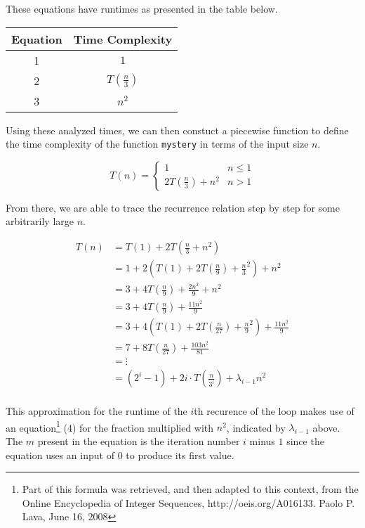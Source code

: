 \documentclass[12pt]{article}
\begin{document}
These equations have runtimes as presented in the table below.

\begin{center}
\begin{tabular}{c|c}
Equation & Time Complexity \\
\hline
1 & $1$ \\
2 & $T(\frac{n}{3})$ \\
3 & $n^2$
\end{tabular}
\end{center}

Using these analyzed times, we can then constuct a piecewise function to define the time complexity of the function \texttt{mystery} in terms of the input size $n$.

\[ T(n) = \begin{cases}
    1 & n \leq 1 \\
    2 T(\frac{n}{3}) + n^2 & n > 1
\end{cases} \]

From there, we are able to trace the recurrence relation step by step for some arbitrarily large $n$.

\begin{align*}
    T(n) &= T(1) + 2 T(\frac{n}{3} + n^2) \\
    &= 1 + 2 (T(1) + 2T(\frac{n}{9}) + \frac{n}{3}^2) + n^2 \\
    &= 3 + 4T(\frac{n}{9}) + \frac{2n^2}{9} + n^2 \\
    &= 3 + 4T(\frac{n}{9}) + \frac{11n^2}{9} \\
    &= 3 + 4 (T(1) + 2T(\frac{n}{27}) + \frac{n}{9}^2) + \frac{11n^2}{9} \\
    &= 7 + 8T(\frac{n}{27}) + \frac{103n^2}{81} \\
    &= \vdots \\
    &= (2^i - 1) + 2i \cdot T(\frac{n}{3^i}) + \lambda_{i-1}n^2
\end{align*} \\

This approximation for the runtime of the $i$th recurence of the loop makes use of an equation\footnote{Part of this formula was retrieved, and then adapted to this context, from the Online Encyclopedia of Integer Sequences, http://oeis.org/A016133. Paolo P. Lava, June 16, 2008} (4) for the fraction multiplied with $n^2$, indicated by $\lambda_{i-1}$ above. The $m$ present in the equation is the iteration number $i$ minus $1$ since the equation uses an input of $0$ to produce its first value.
\end{document}
